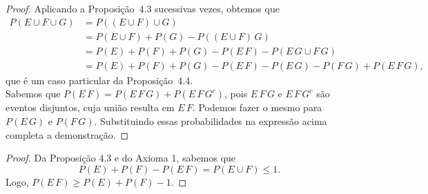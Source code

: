 \begin{questions}
\begin{solution}
\end{solution}

\setcounter{question}{9}
\begin{solution}
\begin{proof}
	Aplicando a Proposição~4.3 sucessivas vezes, obtemos que
    \begin{align*}
    	P( E\cup F\cup G) 
        &= P( (E\cup F)\cup G) \\
        &= P(E\cup F) + P(G) - P((E\cup F)\,G) \\
        &= P(E) + P(F) + P(G) - P(E\,F) - P(E\,G\cup F\,G) \\
        &= P(E) + P(F) + P(G) - P(E\,F) - P(E\,G) - P(F\,G) + P(E\,F\,G),
    \end{align*}
    que é um caso particular da Proposição~4.4. \\
    Sabemos que $P(E\,F) = P(E\,F\,G) + P(E\,F\,G^c)$, pois $E\,F\,G$ e $E\,F\,G^c$ são eventos disjuntos, cuja união resulta em $E\,F$. Podemos fazer o mesmo para $P(E\,G)$ e $P(F\,G)$. Substituindo essas probabilidades na expressão acima completa a demonstração.
\end{proof}
\end{solution}

\begin{solution}
\begin{proof}
	Da Proposição 4.3 e do Axioma 1, sabemos que 
	\[P(E)+P(F)-P(E\,F) = P(E\cup F) \leq 1.\]
    Logo, $P(E\,F) \geq P(E)+P(F)-1$.
\end{proof}
\end{solution}

\end{questions}